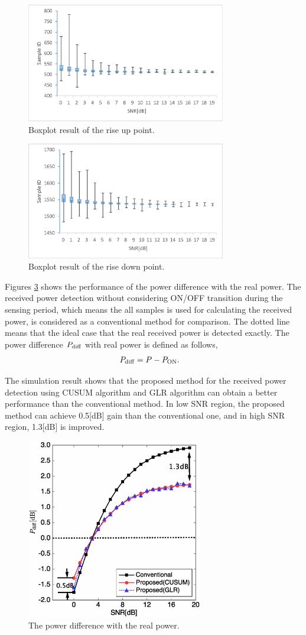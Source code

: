 \begin{figure}[t]
\centering
\includegraphics[width=87mm]{transition_up.eps}
\caption{Boxplot result of the rise up point.}
\label{transition_up}
\end{figure}


\begin{figure}[t]
\centering
\includegraphics[width=87mm]{transition_down.eps}
\caption{Boxplot result of the rise down point.}
\label{transition_down}
\end{figure}

Figures \ref{Powdiff} shows the performance of the power difference with the real power. 
The received power detection without considering ON/OFF transition during the sensing period, which means the all samples is used for calculating the received power, is considered as a conventional method for comparison. The dotted line means that the ideal case that the real received power is detected exactly. The power difference $P_{\rm diff}$ with real power is defined as follows,
\begin{eqnarray}
P_{{\rm diff}} &= P-P_{{\rm ON}}.
\label{diff}
\end{eqnarray}

The simulation result shows that the proposed method for the received power detection using CUSUM algorithm and GLR algorithm can obtain a better performance than the conventional method. In low SNR region, the proposed method can achieve 0.5[dB] gain than the conventional one, and in high SNR region, 1.3[dB] is improved.

\begin{figure}[t]
\centering
\includegraphics[width=77mm]{powdiff.eps}
\caption{The power difference with the real power.}
\label{Powdiff}
\end{figure}
